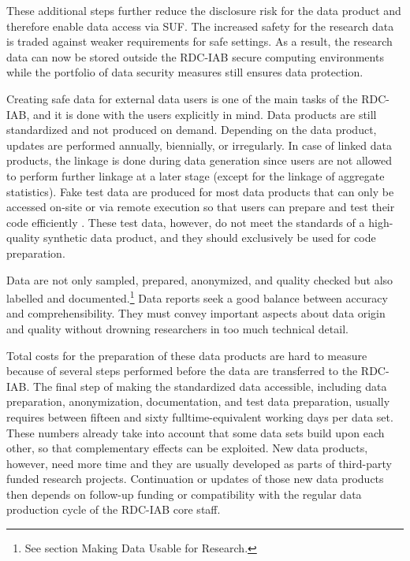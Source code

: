 These additional steps further reduce the disclosure risk for the data product and therefore enable data access via SUF. The increased safety for the research data is traded against weaker requirements for safe settings. As a result, the research data can now be stored outside the RDC-IAB secure computing environments while the portfolio of data security measures still ensures data protection.

Creating safe data for external data users is one of the main tasks of the RDC-IAB, and it is done with the users explicitly in mind. Data products are still standardized and not produced on demand. Depending on the data product, updates are performed annually, biennially, or irregularly. In case of linked data products, the linkage is done during data generation since users are not allowed to perform further linkage at a later stage (except for the linkage of aggregate statistics). Fake test data are produced for most data products that can only be accessed on-site or via remote execution so that users can prepare and test their code efficiently \citep{jacobebbinghaus2010}. These test data, however, do not meet the standards of a high-quality synthetic data product, and they should exclusively be used for code preparation.

Data are not only sampled, prepared, anonymized, and quality checked but also labelled and documented.\footnote{See section Making Data Usable for Research.} Data reports seek a good balance between accuracy and comprehensibility. They must convey important aspects about data origin and quality without drowning researchers in too much technical detail.

Total costs for the preparation of these data products are hard to measure because of several steps performed before the data are transferred to the RDC-IAB. The final step of making the standardized data accessible, including data preparation, anonymization, documentation, and test data preparation, usually requires between fifteen and sixty fulltime-equivalent working days per data set. These numbers already take into account that some data sets build upon each other, so that complementary effects can be exploited. New data products, however, need more time and they are usually developed as parts of third-party funded research projects. Continuation or updates of those new data products then depends on follow-up funding or compatibility with the regular data production cycle of the RDC-IAB core staff.

